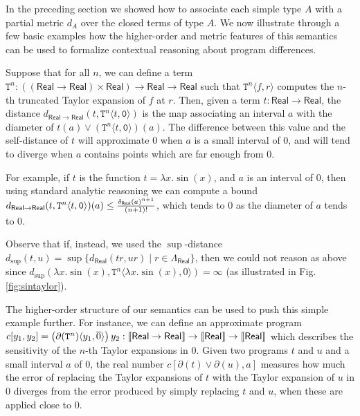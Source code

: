 

In the preceding section we showed how to associate each simple type $A$ with a  partial metric $d_{A}$ over the closed terms of type $A$. We now illustrate through a few basic examples how the higher-order and metric features of this semantics can be used to formalize contextual reasoning about program differences.




\begin{example}

Suppose that for all $n$, we can define a term $\mathtt T^{n}: ((\mathsf{Real}\to \mathsf{Real})\times \mathsf{Real})\to \mathsf{Real}\to \mathsf{Real}$ such that $\mathtt T^{n}\langle f, r\rangle$ computes the $n$-th truncated Taylor expansion of $f$ at $r$. 
Then, given a term $t: \mathsf{Real}\to \mathsf{Real}$, the distance 
$d_{\mathsf{Real}\to\mathsf{Real}}(t, \mathtt T^{n}\langle t,\mathtt 0 \rangle)$ is the map associating an interval $a$ with the diameter of $t(a)\vee (\mathtt T^{n}\langle t,\mathtt 0 \rangle)(a)$. 
The difference between this value and the self-distance of $t$ will approximate 0 when $a$ is a small interval of $0$, and will tend to diverge when $a$ contains points which are far enough from 0. 

For example, if $t$ is the function $t=\lambda x.\sin(x)$, and $a$ is an interval of $0$, then using standard analytic reasoning we can compute a bound
$d_{\mathsf{Real}\to \mathsf{Real}}(t, \mathtt T^{n}\langle t,\mathtt 0 \rangle)(a  )\leq \frac{\delta_{\mathsf{Real}}(a)^{n+1}}{(n+1)!} $, which tends to $0$ as the diameter of $a$ tends to $0$.

Observe that if, instead, we used the $\sup$-distance $d_{\sup}(t,u)= \sup\{d_{\mathsf{Real}}(tr, ur)\mid r\in \Lambda_{\mathsf{Real}}\}$, then we could not reason as above since  
$d_{\sup}(\lambda x.\sin(x), \mathtt T^{n} \langle \lambda x.\sin(x),0\rangle)=\infty$ (as illustrated in Fig. \ref{fig:sintaylor}).  

The higher-order structure of our semantics can be used to push this simple example further. For instance, we can define an approximate program 
$c[y_{1},y_{2}]=\left( \partial (\mathtt T^{n})\langle y_{1}, \overline{0}\rangle\right) y_{2}: \llbracket \mathsf{Real}\to \mathsf{Real} \rrbracket\to \llbracket \mathsf{Real} \rrbracket\to \llbracket \mathsf{Real} \rrbracket$ which describes the sensitivity of the $n$-th Taylor expansions in 0. Given two programs $t$ and $u$ and a small interval $a$ of $0$, the real number $c[\partial(t)\vee \partial(u),a]$ measures how much the error of replacing the Taylor expansions of $t$ with the Taylor expansion of $u$ in $0$ diverges from the error produced by simply replacing  $t$ and $u$, when these are applied close to $0$. 
  
\end{example}


